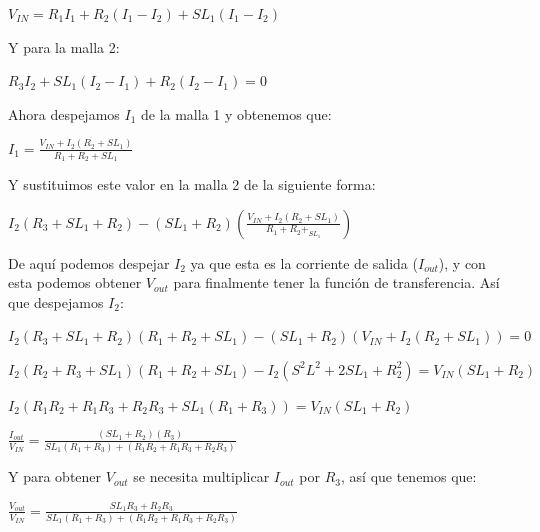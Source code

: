 \documentclass[letterpaper,spanish,12pt]{report}
\begin{document}
	\begin{center}$V_{IN} = R_{1}I_{1}+R_{2}(I_{1}-I_{2})+SL_{1}(I_{1}-I_{2})$ \end{center}

Y para la malla 2:

	\begin{center}$R_{3}I_{2}+SL_{1}(I_{2}-I_{1})+R_{2}(I_{2}-I_{1}) = 0$ \end{center}

Ahora despejamos $I_{1}$ de la malla 1 y obtenemos que:

	\begin{center}$I_{1} = \frac{V_{IN}+I_{2}(R_{2}+SL_{1})}{R_{1}+R_{2}+SL_{1}}$ \end{center}

Y sustituimos este valor en la malla 2 de la siguiente forma:

	\begin{center}$I_{2}(R_{3}+SL_{1}+R_{2}) - (SL_{1}+R_{2})(\frac{V_{IN}+I_{2}(R_{2}+SL_{1})}{R_{1}+R_{2}+_{SL_{1}}})$\end{center}

De aqu\'i podemos despejar $I_{2}$ ya que esta es la corriente de salida ($I_{out}$), y con esta podemos obtener $V_{out}$ para finalmente tener la funci\'on de transferencia. As\'i que despejamos $I_{2}$:

	\begin{center}$I_{2}(R_{3}+SL_{1}+R_{2})(R_{1}+R_{2}+SL_{1}) - (SL_{1}+R_{2})(V_{IN}+I_{2}(R_{2}+SL_{1})) = 0$\end{center} 
	
	\begin{center}$I_{2}(R_{2}+R_{3}+SL_{1})(R_{1}+R_{2}+SL_{1}) - I_{2}(S^{2}L^{2}+2SL_{1}+R_{2}^{2}) = V_{IN}(SL_{1}+R_{2})$\end{center}

\begin{center}$I_{2}(R_{1}R_{2}+R_{1}R_{3}+R_{2}R_{3}+SL_{1}(R_{1}+R_{3})) = V_{IN}(SL_{1}+R_{2})$\end{center}

\begin{center}$\frac{I_{out}}{V_{IN}} = \frac{(SL_{1}+R_{2})(R_{3})}{SL_{1}(R_{1}+R_{3})+(R_{1}R_{2}+R_{1}R_{3}+R_{2}R_{3})}$\end{center}

Y para obtener $V_{out}$ se necesita multiplicar $I_{out}$ por $R_{3}$, as\'i que tenemos que:

\begin{center}$\frac{V_{out}}{V_{IN}} = \frac{SL_{1}R_{3}+R_{2}R_{3}}{SL_{1}(R_{1}+R_{3})+(R_{1}R_{2}+R_{1}R_{3}+R_{2}R_{3})}$\end{center}
\end{document}
